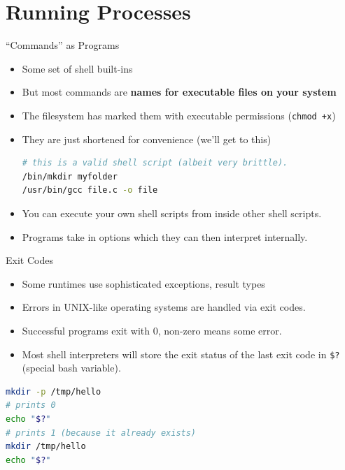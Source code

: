 \documentclass{../lecture}
\begin{document}
\section{Running Processes}

\begin{frame}[fragile]{``Commands'' as Programs}
\begin{itemize}
  \item Some set of shell built-ins
  \item But most commands are \textbf{names for executable files on your system}
  \item The filesystem has marked them with executable permissions
    (\texttt{chmod +x})
  \item They are just shortened for convenience (we'll get to this)
\begin{lstlisting}[language=bash]
# this is a valid shell script (albeit very brittle).
/bin/mkdir myfolder
/usr/bin/gcc file.c -o file
\end{lstlisting}
  \item You can execute your own shell scripts from inside other shell scripts.
  \item Programs take in options which they can then interpret internally.
\end{itemize}
\end{frame}

\begin{frame}[fragile]{Exit Codes}
  \begin{itemize}
    \item Some runtimes use sophisticated exceptions, result types
    \item Errors in UNIX-like operating systems are handled via exit codes.
    \item Successful programs exit with 0, non-zero means some error.
    \item Most shell interpreters will store the exit status of the last exit
      code in \texttt{\$?} (special bash variable).
  \end{itemize}
\begin{lstlisting}[language=bash]
mkdir -p /tmp/hello
# prints 0
echo "$?"
# prints 1 (because it already exists)
mkdir /tmp/hello
echo "$?"
\end{lstlisting}
\end{frame}
\end{document}
